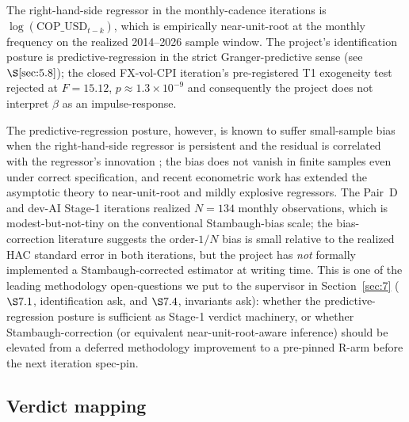 The right-hand-side regressor in the monthly-cadence iterations is
\(\log(\mathrm{COP\_USD}_{t-k})\), which is empirically near-unit-root
at the monthly frequency on the realized 2014--2026 sample window. The
project's identification posture is predictive-regression in the strict
Granger-predictive sense (see \(\S\ref{sec:5.8}\)); the closed FX-vol-CPI
iteration's pre-registered T1 exogeneity test rejected at
\(F = 15.12\), \(p \approx 1.3 \times 10^{-9}\) and consequently the
project does not interpret \(\hat{\beta}\) as an impulse-response.

The predictive-regression posture, however, is known to suffer
small-sample bias when the right-hand-side regressor is persistent and
the residual is correlated with the regressor's innovation
\citep{stambaugh1999}; the bias does not vanish in finite samples even
under correct specification, and recent econometric work
\citep{phillips2014} has extended the asymptotic theory to near-unit-root
and mildly explosive regressors. The Pair~D and dev-AI Stage-1
iterations realized \(N = 134\) monthly observations, which is
modest-but-not-tiny on the conventional Stambaugh-bias scale; the
bias-correction literature suggests the order-\(1/N\) bias is small
relative to the realized HAC standard error in both iterations, but the
project has \emph{not} formally implemented a Stambaugh-corrected
estimator at writing time. This is one of the leading methodology
open-questions we put to the supervisor in Section~\ref{sec:7}
(\(\S 7.1\), identification ask, and \(\S 7.4\), invariants ask): whether
the predictive-regression posture is sufficient as Stage-1 verdict
machinery, or whether Stambaugh-correction (or equivalent
near-unit-root-aware inference) should be elevated from a deferred
methodology improvement to a pre-pinned R-arm before the next iteration
spec-pin.

\subsection{Verdict mapping}\label{sec:5.6}

